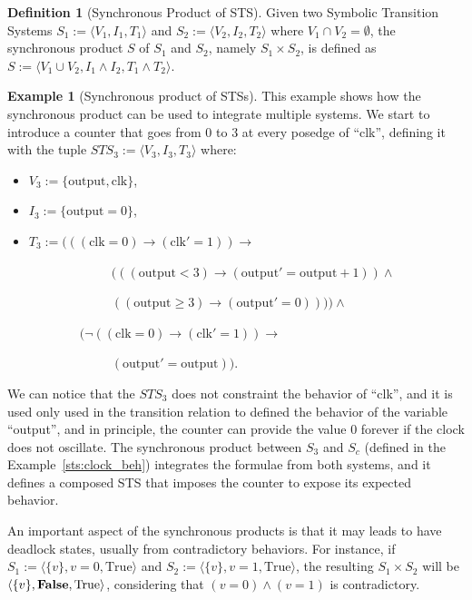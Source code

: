 \documentclass{article}
\theoremstyle{definition}
\newtheorem{example}{Example}[section]
\newtheorem{definition}{Definition}[section]
\begin{document}
\begin{definition}[Synchronous Product of STS]
  \label{def:sync}
  Given two Symbolic Transition Systems $S_1 := \langle V_1, I_1,
  T_1\rangle$ and $S_2 := \langle V_2, I_2, T_2\rangle$ where $V_1
  \cap V_2 = \emptyset$, the synchronous product $S$ of $S_1$ and
  $S_2$, namely $S_1 \times S_2$, is defined as $S := \langle V_1 \cup
  V_2, I_1 \wedge I_2, T_1 \wedge T_2 \rangle$.
\end{definition}

\begin{example}[Synchronous product of STSs]
This example shows how the synchronous product can be used to
integrate multiple systems. We start to introduce a counter that goes
from 0 to 3 at every posedge of ``clk'', defining it with the tuple
$STS_3 := \langle V_3, I_3, T_3\rangle$ where:
\begin{itemize}
\item $V_3 := \{\text{output}, \text{clk}\}$,
\item $I_3 := \{\text{output} = 0\}$,
\item $T_3 := (((\text{clk} = 0) \rightarrow (\text{clk}' = 1)) \rightarrow $

~~~~~~~~~~~~~$(((\text{output} < 3) \rightarrow (\text{output}' = \text{output} +
  1)) \wedge$

~~~~~~~~~~~~~$((\text{output} \geq 3) \rightarrow (\text{output}' = 0)))) \wedge$

~~~~~~~~$(\neg((\text{clk} = 0) \rightarrow (\text{clk}' = 1)) \rightarrow$

~~~~~~~~~~~~~$(\text{output}' = \text{output}))$.
  
\end{itemize}

We can notice that the $STS_3$ does not constraint the behavior of
``clk'', and it is used only used in the transition relation to
defined the behavior of the variable ``output'', and in principle, the
counter can provide the value 0 forever if the clock does not
oscillate. The synchronous product between $S_3$ and $S_c$ (defined in
the Example~\ref{sts:clock_beh}) integrates the formulae from both
systems, and it defines a composed STS that imposes the counter to
expose its expected behavior.

An important aspect of the synchronous products is that it may leads
to have deadlock states, usually from contradictory behaviors. For
instance, if $S_1 := \langle \{v\}, v = 0, \text{True}\rangle$ and
$S_2 := \langle \{v\}, v = 1, \text{True}\rangle$, the resulting $S_1
\times S_2$ will be $\langle \{v\}, \text{\textbf{False}},
\text{True}\rangle$, considering that $(v = 0) \wedge (v=1)$ is
contradictory.
  
\end{example}  
\end{document}
